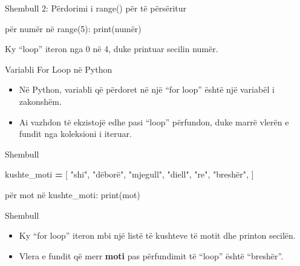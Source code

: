 \documentclass[
  ignorenonframetext,
]{beamer}
\newenvironment{Shaded}{\begin{snugshade}}{\end{snugshade}}
\newcommand{\BuiltInTok}[1]{#1}
\newcommand{\DecValTok}[1]{\textcolor[rgb]{0.00,0.00,0.81}{#1}}
\newcommand{\NormalTok}[1]{#1}
\newcommand{\OperatorTok}[1]{\textcolor[rgb]{0.81,0.36,0.00}{\textbf{#1}}}
\newcommand{\StringTok}[1]{\textcolor[rgb]{0.31,0.60,0.02}{#1}}
\begin{document}
\begin{frame}[fragile]{Shembull 2: Përdorimi i range() për të
përsëritur}
\protect\hypertarget{shembull-2-puxebrdorimi-i-range-puxebr-tuxeb-puxebrsuxebritur}{}
\begin{Shaded}
\begin{Highlighting}[]
\NormalTok{për numër në }\BuiltInTok{range}\NormalTok{(}\DecValTok{5}\NormalTok{):}
    \BuiltInTok{print}\NormalTok{(numër)}
\end{Highlighting}
\end{Shaded}

Ky ``loop'' iteron nga 0 në 4, duke printuar secilin numër.
\end{frame}

\begin{frame}{Variabli For Loop në Python}
\protect\hypertarget{variabli-for-loop-nuxeb-python}{}
\begin{itemize}
\item
  Në Python, variabli që përdoret në një ``for loop'' është një variabël
  i zakonshëm.
\item
  Ai vazhdon të ekzistojë edhe pasi ``loop'' përfundon, duke marrë
  vlerën e fundit nga koleksioni i iteruar.
\end{itemize}
\end{frame}

\begin{frame}[fragile]{Shembull}
\protect\hypertarget{shembull-2}{}
\begin{Shaded}
\begin{Highlighting}[]
\NormalTok{kushte\_moti }\OperatorTok{=}\NormalTok{ [}
    \StringTok{"shi"}\NormalTok{,}
    \StringTok{"dëborë"}\NormalTok{,}
    \StringTok{"mjegull"}\NormalTok{,}
    \StringTok{"diell"}\NormalTok{,}
    \StringTok{"re"}\NormalTok{,}
    \StringTok{"breshër"}\NormalTok{,}
\NormalTok{]}

\NormalTok{për mot në kushte\_moti:}
    \BuiltInTok{print}\NormalTok{(mot)}
\end{Highlighting}
\end{Shaded}
\end{frame}

\begin{frame}{Shembull}
\protect\hypertarget{shembull-3}{}
\begin{itemize}
\item
  Ky ``for loop'' iteron mbi një listë të kushteve të motit dhe printon
  secilën.
\item
  Vlera e fundit që merr \textbf{moti} pas përfundimit të ``loop'' është
  ``breshër''.
\end{itemize}
\end{frame}
\end{document}
